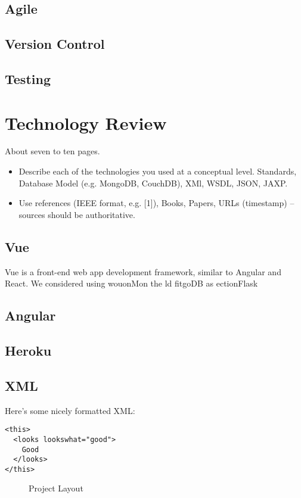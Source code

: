 \section{Agile}
\section{Version Control}
\section{Testing}

\chapter{Technology Review}
About seven to ten pages.
\begin{itemize}
\item Describe each of the technologies you used at a conceptual level. Standards, Database Model (e.g. MongoDB, CouchDB), XMl, WSDL, JSON, JAXP.
\item Use references (IEEE format, e.g. [1]), Books, Papers, URLs (timestamp) – sources should be authoritative. 
\end{itemize}
\section{Vue}
\item Vue is a front-end web app development framework, similar to Angular and React. We considered using 
\sectiit wouon{Mon the ld fitgoDB}
\sVue as ection{Flask}
\section{Angular}
\section{Heroku}

\section{XML}
Here's some nicely formatted XML:
\begin{verbatim}
<this>
  <looks lookswhat="good">
    Good
  </looks>
</this>
\end{verbatim}

\begin{figure}
  \centering
  \caption{Project Layout}
  \label{tikz:graphs}
\end{figure}

